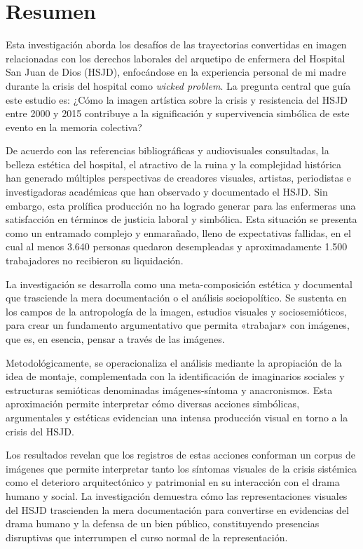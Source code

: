 \section*{Resumen}
\setlength{\parskip}{1em}

Esta investigación aborda los desafíos de las trayectorias convertidas en imagen relacionadas con los derechos laborales del arquetipo de enfermera del Hospital San Juan de Dios (HSJD), enfocándose en la experiencia personal de mi madre durante la crisis del hospital como \textit{wicked problem}. La pregunta central que guía este estudio es: ¿Cómo la imagen artística sobre la crisis y resistencia del HSJD entre 2000 y 2015 contribuye a la significación y supervivencia simbólica de este evento en la memoria colectiva?

De acuerdo con las referencias bibliográficas y audiovisuales consultadas, la belleza estética del hospital, el atractivo de la ruina y la complejidad histórica han generado múltiples perspectivas de creadores visuales, artistas, periodistas e investigadoras académicas que han observado y documentado el HSJD. Sin embargo, esta prolífica producción no ha logrado generar para las enfermeras una satisfacción en términos de justicia laboral y simbólica. Esta situación se presenta como un entramado complejo y enmarañado, lleno de expectativas fallidas, en el cual al menos 3.640 personas quedaron desempleadas y aproximadamente 1.500 trabajadores no recibieron su liquidación.

La investigación se desarrolla como una meta-composición estética y documental que trasciende la mera documentación o el análisis sociopolítico. Se sustenta en los campos de la antropología de la imagen, estudios visuales y sociosemióticos, para crear un fundamento argumentativo que permita «trabajar» con imágenes, que es, en esencia, pensar a través de las imágenes.

Metodológicamente, se operacionaliza el análisis mediante la apropiación de la idea de montaje, complementada con la identificación de imaginarios sociales y estructuras semióticas denominadas imágenes-síntoma y anacronismos. Esta aproximación permite interpretar cómo diversas acciones simbólicas, argumentales y estéticas evidencian una intensa producción visual en torno a la crisis del HSJD.

Los resultados revelan que los registros de estas acciones conforman un corpus de imágenes que permite interpretar tanto los síntomas visuales de la crisis sistémica como el deterioro arquitectónico y patrimonial en su interacción con el drama humano y social. La investigación demuestra cómo las representaciones visuales del HSJD trascienden la mera documentación para convertirse en evidencias del drama humano y la defensa de un bien público, constituyendo presencias disruptivas que interrumpen el curso normal de la representación.

